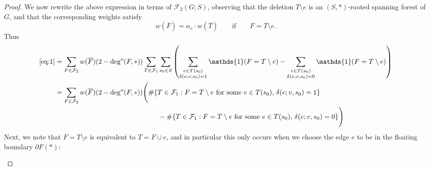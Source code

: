 \documentclass{amsart}
\theoremstyle{definition}
\newcommand{\one}{\mathds{1}}
\newcommand{\trees}{\mathcal{F}_1}
\newcommand{\forests}{\mathcal{F}}
\begin{document}
\begin{proof}
We now rewrite the above expression in terms of $\forests_2(G;S)$,
observing that the deletion $T \setminus e$ is an $(S,*)$-rooted spanning forest of $G$, 
and that the corresponding weights satisfy
\[
	w(\overline{F}) = \alpha_e \cdot w(\overline{T}) \qquad\text{if}\qquad F = T \setminus e.
\]
Thus
\begin{align*}
	\eqref{eq:1} &= \sum_{F \in \forests_2} w(\overline{F}) (2 - \deg^o(F,*)) \sum_{T\in \trees} \sum_{s_0 \in S} \left( \sum_{\substack{e \in T(s_0) \\ \delta(e; v,s_0) = 1}} \one(F = T \setminus e) -  \sum_{\substack{e \in T(s_0) \\ \delta(e; v,s_0) = 0}} \one(F = T \setminus e) \right) \\
	&= \sum_{F \in \forests_2} w(\overline{F}) (2 - \deg^o(F,*)) \Bigg( \#\{T \in \trees : F = T \setminus e \text{ for some } e \in T(s_0),\, \delta(e;v,s_0) = 1 \} \\
	&\qquad\qquad\qquad\qquad\qquad\qquad\qquad\quad - \#\{T \in \trees : F = T \setminus e \text{ for some } e \in T(s_0),\, \delta(e; v,s_0) = 0 \} \Bigg)
\end{align*}
Next, we note that $F = T \setminus e$ is equivalent to $T = F \cup e$, and in particular this only occurs when we choose the edge $e$ to be in the floating boundary $\partial F(*)$:

\begin{figure}[h]
\qquad\qquad
\end{figure}
\end{proof}
\end{document}

